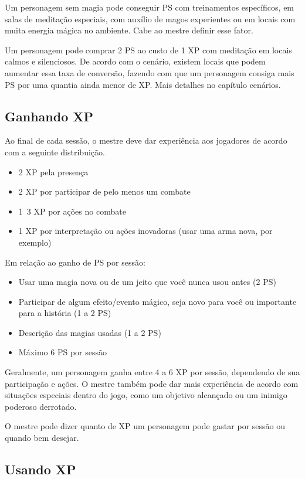 Um personagem sem magia pode conseguir PS com treinamentos específicos, em salas de meditação especiais, com auxílio de magos experientes ou em locais com muita energia mágica no ambiente. Cabe ao mestre definir esse fator.

Um personagem pode comprar 2 PS ao custo de 1 XP com meditação em locais calmos e silenciosos. De acordo com o cenário, existem locais que podem aumentar essa taxa de conversão, fazendo com que um personagem consiga mais PS por uma quantia ainda menor de XP. Mais detalhes no capítulo cenários.

\subsection{Ganhando XP}
	
Ao final de cada sessão, o mestre deve dar experiência aos jogadores de acordo com a seguinte distribuição. 

\begin{itemize}
\item  2 XP pela presença
\item  2 XP por participar de pelo menos um combate
\item  1~3 XP por ações no combate
\item  1 XP por interpretação ou ações inovadoras (usar uma arma nova, por exemplo)
\end{itemize}

	Em relação ao ganho de PS por sessão:
\begin{itemize}
\item Usar uma magia nova ou de um jeito que você nunca usou antes (2 PS)
\item Participar de algum efeito/evento mágico, seja novo para você ou importante para a história (1 a 2 PS)
\item Descrição das magias usadas (1 a 2 PS)
\item Máximo 6 PS por sessão 
\end{itemize}

Geralmente, um personagem ganha entre 4 a 6 XP por sessão, dependendo de sua participação e ações. O mestre também pode dar mais experiência de acordo com situações especiais dentro do jogo, como um objetivo alcançado ou um inimigo poderoso derrotado.

O mestre pode dizer quanto de XP um personagem pode gastar por sessão ou quando bem desejar. 

\subsection{Usando XP}

